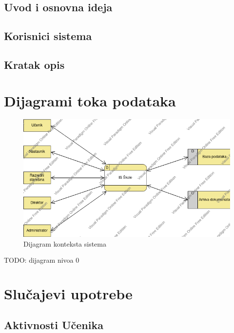 \documentclass{article}
\begin{document}
\subsection{Uvod i osnovna ideja}
\subsection{Korisnici sistema}
\subsection{Kratak opis}


\newpage
\section{Dijagrami toka podataka}

\begin{figure} [!ht]
    \begin{center}
        \includegraphics[scale=0.5]{imgs/dijagram_konteksta.png}
    \end{center}
\caption{Dijagram konteksta sistema}
\end{figure}

TODO: dijagram nivoa 0

\newpage
\section{Slučajevi upotrebe}

\subsection{Aktivnosti Učenika}
\end{document}
